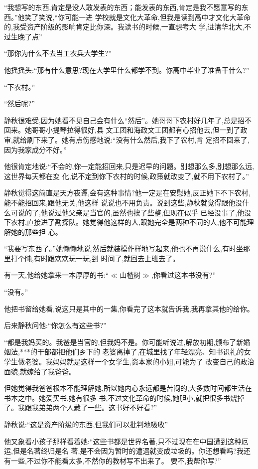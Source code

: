 ﻿\documentclass[12pt]{article}
\begin{document}
``我想写的东西,肯定是没人敢发表的东西；能发表的东西,肯定是我不愿意写的东西。''他笑了笑说,``你可能一进
学校就是文化大革命,但我是读到高中才文化大革命的,我受资产阶级的影响肯定比你深。我读书的时候,一直想考大
学,进清华北大,不过生晚了点\myrule ''

``那你为什么不去当工农兵大学生?''

他摇摇头:``那有什么意思?现在大学里什么都学不到\myrule 。你高中毕业了准备干什么?''

``下农村。''

``然后呢?''

静秋很难受,因为她看不见自己会有什么``然后''。她哥哥下农村好几年了,总是招不回来。她哥哥小提琴拉得很好,县
文工团和海政文工团都有心招他去,但一到了政审,就给刷下来了。她有点伤感地说:``没有什么然后,我下了农村,肯
定招不回来了,因为我家\myrule 成分不好。''

他很肯定地说:``不会的,你一定能招回来,只是\myrule 迟早的问题。别想那么多,别想那么远,这世界每天都在变
化,说不定到你下农村的时候,政策就改变了,就不用下农村了。''

静秋觉得这简直是天方夜谭,会有这种事情?他一定是在安慰她,反正她下不下农村,能不能招回来,跟他无关,他这样
说说也不用负责。说到这些,静秋就觉得跟他没什么可说的了,他说过他父亲是当官的,虽然也挨了些整,但现在似乎
已经没事了,他没下农村,直接进了勘探队。她觉得他这样的人,跟她完全是两种不同的人,他不可能理解她的那些担
心。

``我要写东西了。''她懒懒地说,然后就装模作样地写起来,他也不再说什么,有时坐那里打个盹,有时跟欢欢玩一玩,到
时间了,就回去上班去了。

有一天,他给她拿来一本厚厚的书:``$\ll$山楂树$\gg$,你看过这本书没有?''

``没有。''

他把书留给她看,说这只是其中的一集,你看完了这本就告诉我,我再拿其他的给你。

后来静秋问他:``你怎么有这些书?''

``都是我妈买的。我爸是当官的,但我妈不是。你可能听说过,解放初期,颁布了新婚姻法,***的干部都把他们乡下的
老婆离掉了,在城里找了年轻漂亮、知书识礼的女学生做老婆。我妈妈就是这样一个女学生,资本家的小姐,可能为了
改变自己的政治面貌,就嫁给了我爸爸。

但她觉得我爸爸根本不能理解她,所以她内心永远都是苦闷的,大多数时间都生活在书本之中。她爱买书,她有很多
书,不过文化革命的时候,她胆小,就把很多书烧掉了。我跟我弟弟两个人藏了一些。这书好不好看?''

静秋说:``这是资产阶级的东西,但我们可以批判地吸收\myrule ''

他又象看小孩子那样看着她:``这些书都是世界名著,只不过\myrule 现在在中国遭到这种厄运,但是名著终归是名
著,是不会因为暂时的遭遇就变成垃圾的。你还想看吗?我还有一些,不过你不能看太多,不然你的教材写不出来了。
要不,我帮你写?''
\end{document}
